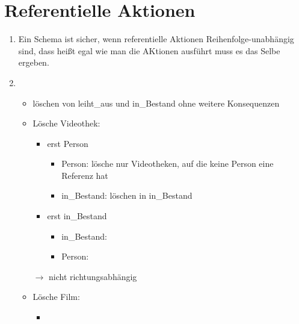\documentclass[ngerman]{gdb-aufgabenblatt}
\begin{document}
\section{Referentielle Aktionen}
\begin{enumerate}
\item
Ein Schema ist sicher, wenn referentielle Aktionen Reihenfolge-unabh\"angig sind, dass hei{\ss}t egal wie man die AKtionen ausf\"uhrt muss es das Selbe ergeben.
\item
\begin{itemize}
\item l{\"o}schen von leiht{\_}aus und in{\_}Bestand ohne weitere Konsequenzen
\item L{\"o}sche Videothek:\\
\begin{itemize}
\item erst Person
\begin{itemize}
\item Person: l{\"o}sche nur Videotheken, auf die keine Person eine Referenz hat
\item in{\_}Bestand: l{\"o}schen in in{\_}Bestand
\end{itemize}
\item erst in{\_}Bestand
\begin{itemize}
\item in{\_}Bestand: 
\item Person: 
\end{itemize}
\end{itemize}
$\rightarrow$ nicht richtungsabh\"angig
\item L{\"o}sche Film:
\begin{itemize}
\item 

\end{itemize}
\end{itemize}
\end{enumerate}
\end{document}
